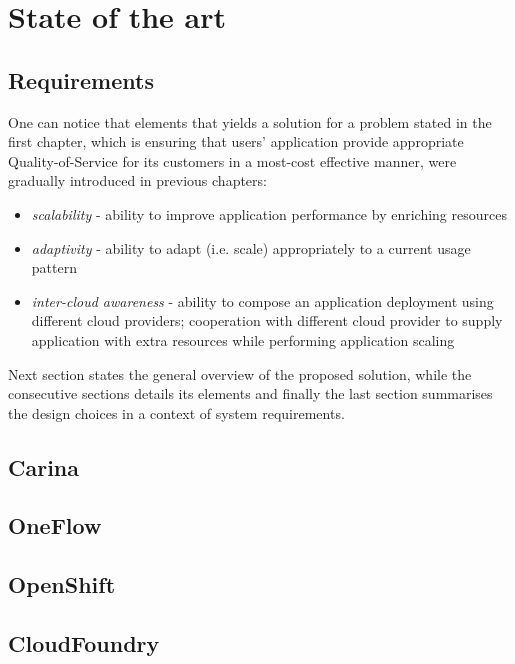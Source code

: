 \chapter{State of the art} 

\section{Requirements}
One can notice that elements that yields a solution for a problem stated in the first chapter, which is ensuring that users' application provide appropriate Quality-of-Service for its customers in a most-cost effective manner, were gradually introduced in previous chapters:

\begin{itemize}
	\item \emph{scalability} - ability to improve application performance by enriching resources
	\item \emph{adaptivity} - ability to adapt (i.e. scale) appropriately to a current usage pattern
	\item \emph{inter-cloud awareness} - ability to compose an application deployment using different cloud providers; cooperation with different cloud provider to supply application with extra resources while performing application scaling
\end{itemize}

Next section states the general overview of the proposed solution, while the consecutive sections details its elements and finally the last section summarises the design choices in a context of system requirements.
	
\section{Carina}

\section{OneFlow}

\section{OpenShift}

\section{CloudFoundry}


	